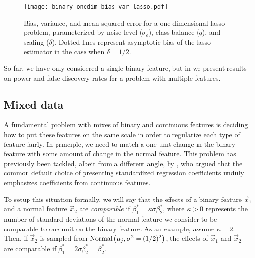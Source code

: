 \begin{figure}[htb]
  \centering
  \texttt{[image: binary\_onedim\_bias\_var\_lasso.pdf]}
  \caption{%
    Bias, variance, and mean-squared error for a one-dimensional lasso problem,
    parameterized by noise level (\(\sigma_\varepsilon\)), class balance (\(q\)), and
    scaling (\(\delta\)). Dotted lines represent asymptotic bias of the lasso
    estimator in the case when \(\delta = 1/2\).}
  \label{fig:bias-var-onedim-lasso}
\end{figure}

So far, we have only considered a single binary feature, but in
 we present results on power and false discovery rates for a
problem with multiple features.

\subsection{Mixed data}%
\label{sec:mixed-data}

A fundamental problem with mixes of binary and continuous features is deciding how to put
these features on the same scale in order to regularize each type of feature fairly. In
principle, we need to match a one-unit change in the binary feature with some amount of
change in the normal feature. This problem has previously been tackled, albeit from a
different angle, by \citet{gelman2008}, who argued that the common default choice of
presenting standardized regression coefficients unduly emphasizes coefficients from
continuous features.

To setup this situation formally, we will say that the effects of a binary feature
\(\vec{x}_1\) and a normal feature \(\vec{x}_2\) are \emph{comparable} if \(\beta^*_1 =
\kappa \sigma \beta^*_2\), where \(\kappa > 0\) represents the number of standard
deviations of the normal feature we consider to be comparable to one unit on the binary
feature. As an example, assume \(\kappa = 2\). Then, if \(\vec{x}_2\) is sampled from
\(\operatorname{Normal}\left(\mu_j, \sigma^2 = (1/2)^2\right)\), the effects of \(\vec{x}_1\) and
\(\vec{x}_2\) are comparable if \(\beta_1^* = 2\sigma \beta_2^* = \beta_2^*\).

